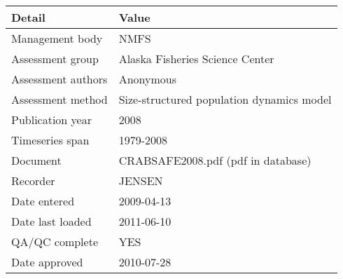 \begin{table}[htb]
\centering
\begin{tabular}{lp{7cm}}
\toprule
Detail & Value \\
\midrule
Management body    & NMFS                                      \\
Assessment group   & Alaska Fisheries Science Center           \\
Assessment authors & Anonymous                                 \\
Assessment method  & Size-structured population dynamics model \\
Publication year   & 2008                                      \\
Timeseries span    & 1979-2008                                 \\
Document           & CRABSAFE2008.pdf (pdf in database)        \\
Recorder           & JENSEN                                    \\
Date entered       & 2009-04-13                                \\
Date last loaded   & 2011-06-10                                \\
QA/QC complete     & YES                                       \\
Date approved      & 2010-07-28                                \\
\bottomrule
\end{tabular}
\label{tab:assessdet}
\end{table}
